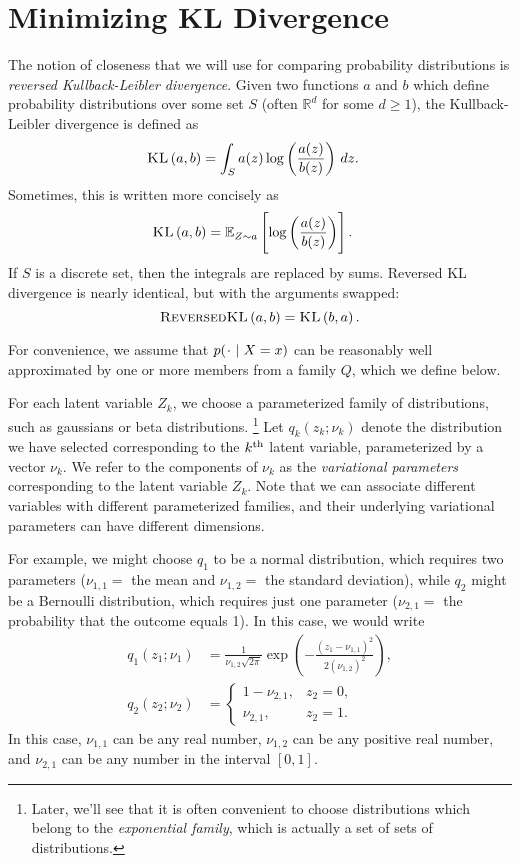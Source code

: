 \documentclass[11pt]{article}
\newcommand{\KL}[2]{\textsc{KL}\left( {#1} , {#2} \right)}
\newcommand{\rKL}[2]{\textsc{ReversedKL}\left( {#1} , {#2} \right)}
\newcommand*{\placeholder}{\makebox[1ex]{$\cdot$}}
\begin{document}
\section{Minimizing KL Divergence}

The notion of closeness that we will use for comparing probability distributions is \emph{reversed Kullback-Leibler divergence}.
Given two functions $a$ and $b$ which define probability distributions over some set $S$ (often $\mathbb R^d$ for some $d \geq 1$), the Kullback-Leibler divergence is defined as
\begin{align}
\KL{a}{b}
&= \int_S a(z) \log \left( \frac{a(z)}{b(z)} \right) \, dz.
\end{align}
Sometimes, this is written more concisely as
\begin{align}
\KL{a}{b}
&= \expectOver{Z \sim a}{ \log \left( \frac{a(z)}{b(z)} \right) }.
\end{align}
If $S$ is a discrete set, then the integrals are replaced by sums.
Reversed KL divergence is nearly identical, but with the arguments swapped:
\[ \rKL{a}{b} = \KL{b}{a}. \]

For convenience, we assume that $p(\placeholder \mid X = x)$ can be reasonably well approximated by one or more members from a family $Q$, which we define below.

For each latent variable $Z_k$, we choose a parameterized family of distributions, such as gaussians or beta distributions.%
\footnote{Later, we'll see that it is often convenient to choose distributions which belong to the \emph{exponential family}, which is actually a set of sets of distributions.}
Let $q_k(z_k; \nu_k)$ denote the distribution we have selected corresponding to the $k^{\mathrm{th}}$ latent variable, parameterized by a vector $\nu_k$.
We refer to the components of $\nu_k$ as the \emph{variational parameters} corresponding to the latent variable $Z_k$.
Note that we can associate different variables with different parameterized families, and their underlying variational parameters can have different dimensions.

For example, we might choose $q_1$ to be a normal distribution, which requires two parameters ($\nu_{1,1} =$ the mean and $\nu_{1,2} =$ the standard deviation), while $q_2$ might be a Bernoulli distribution, which requires just one parameter ($\nu_{2,1} =$ the probability that the outcome equals 1).
In this case, we would write
\begin{align}
q_1(z_1; \nu_1) &= \frac{1}{\nu_{1,2} \sqrt{2 \pi}} \exp\left( -\frac{(z_1 - \nu_{1,1})^2}{2 (\nu_{1,2})^2} \right), \\
q_2(z_2; \nu_2) &=
    \begin{cases}
    1-\nu_{2,1}, & z_2 = 0, \\
    \nu_{2,1},   & z_2 = 1.
    \end{cases}
\end{align}
In this case, $\nu_{1,1}$ can be any real number, $\nu_{1,2}$ can be any positive real number, and $\nu_{2,1}$ can be any number in the interval $[0,1]$.
\end{document}
